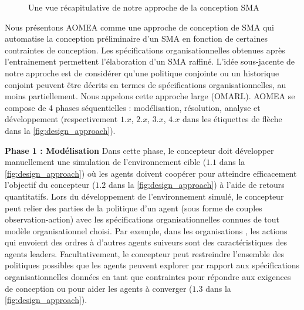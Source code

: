 \begin{figure}[h!]
  \centering
  
  \caption{Une vue récapitulative de notre approche de la conception SMA}
  \label{fig:design_approach}
\end{figure}

Nous présentons AOMEA comme une approche de conception de SMA qui automatise la conception préliminaire d'un SMA en fonction de certaines contraintes de conception. Les spécifications organisationnelles obtenues après l'entrainement permettent l'élaboration d'un SMA raffiné.
L'idée sous-jacente de notre approche est de considérer qu'une politique conjointe ou un historique conjoint peuvent être décrits en termes de spécifications organisationnelles, au moins partiellement.
Nous appelons cette approche large  (OMARL).
%
%
AOMEA se compose de 4 phases séquentielles : modélisation, résolution, analyse et développement (respectivement $1.x$, $2.x$, $3.x$, $4.x$ dans les étiquettes de flèche dans la \autoref{fig:design_approach}).

\textbf{Phase 1 : Modélisation} \quad Dans cette phase, le concepteur doit développer manuellement une simulation de l'environnement cible ($1.1$ dans la \autoref{fig:design_approach}) où les agents doivent coopérer pour atteindre efficacement l'objectif du concepteur ($1.2 $ dans la \autoref{fig:design_approach}) à l'aide de retours quantitatifs. Lors du développement de l'environnement simulé, le concepteur peut relier des parties de la politique d'un agent (sous forme de couples observation-action) avec les spécifications organisationnelles connues de tout modèle organisationnel choisi.
Par exemple, dans les organisations , les actions qui envoient des ordres à d'autres agents suiveurs sont des caractéristiques des agents leaders.
Facultativement, le concepteur peut restreindre l'ensemble des politiques possibles que les agents peuvent explorer par rapport aux spécifications organisationnelles données en tant que contraintes pour répondre aux exigences de conception ou pour aider les agents à converger ($1.3$ dans la \autoref{fig:design_approach}).

